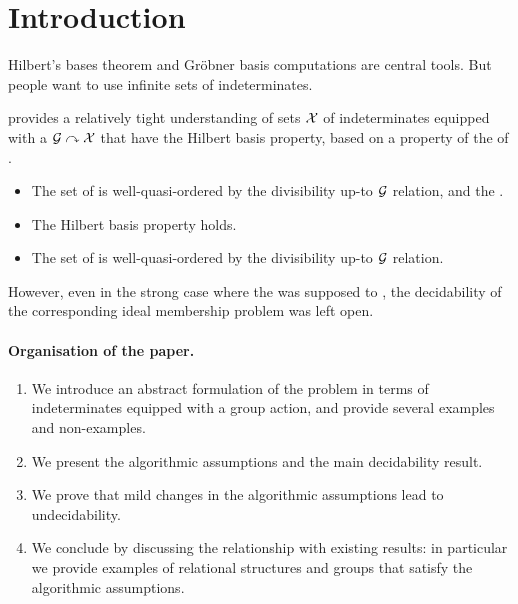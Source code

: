 \section{Introduction}
\label{sec:intro}

Hilbert’s bases theorem and Gröbner basis computations
are central tools. But people want to use infinite sets
of indeterminates.


\cite{GHOLAS24} provides a relatively tight understanding of sets $\mathcal{X}$ of
indeterminates equipped with a  $\mathcal{G} \curvearrowright \mathcal{X}$
that have the Hilbert basis property, based on a property of the
 of .

\begin{itemize}
    \item The set of  is well-quasi-ordered
        by the divisibility up-to $\mathcal{G}$ relation,
        and the  .
    \item The Hilbert basis property holds.
    \item The set of  is well-quasi-ordered
        by the divisibility up-to $\mathcal{G}$ relation.
\end{itemize}

However, even in the strong case where the  was supposed to
, the decidability of the corresponding ideal
membership problem was left open.


\paragraph{Organisation of the paper.}
\begin{enumerate}
    \item We introduce an abstract formulation of the problem 
        in terms of indeterminates equipped with a group action, and
        provide several examples and non-examples.
    \item We present the algorithmic assumptions and the main decidability
        result.
    \item We prove that mild changes in the algorithmic assumptions
        lead to undecidability.
    \item We conclude by discussing the relationship with existing
        results: in particular we provide examples of relational
        structures and groups that satisfy the algorithmic assumptions.
\end{enumerate}
